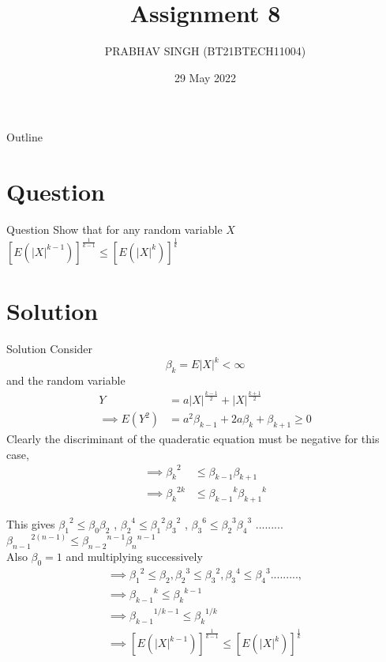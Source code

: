 \documentclass{beamer}
\title{Assignment 8}
\author{PRABHAV SINGH (BT21BTECH11004)}
\date{29 May 2022}
\begin{document}
	
	\begin{frame}
		\titlepage 
	\end{frame}
	
	\logo{}
	
	
	\begin{frame}{Outline}
		\tableofcontents
	\end{frame}
	
	\section{Question}
	\begin{frame}{Question}
	Show that for any random variable $ X $\\
	$ [E(|X|^{k-1})]^{\frac{1}{k-1}} \leq [E(|X|^{k})]^{\frac{1}{k}}$ \\
	\end{frame}
	
	
	\section{Solution}
		\begin{frame}{Solution}
	Consider
	\begin{equation}
		{\beta}_k =E{|X|^{k}} < \infty
	\end{equation}
	and the random variable\\
	\begin{align}
		Y&=a|X|^{\frac{k-1}{2}}+|X|^{\frac{k+1}{2}}\\
		\implies E(Y^{2})&=a^{2}{\beta_{k-1}}+2a{\beta_k}+{\beta_{k+1}} \geq 0
	\end{align}
Clearly the discriminant of the quaderatic equation must be negative for this case,
\begin{align}
	\implies {\beta_k}^{2} &\leq {\beta_{k-1}}{\beta_{k+1}} \\
	\implies  {\beta_k}^{2k} &\leq {{\beta_{k-1}}^{k}}{{\beta_{k+1}}^{k}}  
\end{align}
\end{frame} 

\begin{frame}
	This gives $  {\beta_1}^{2} \leq {{\beta_{0}}}{{\beta_{2}}} $ ,  $  {\beta_2}^{4} \leq {{\beta_{1}}^{2}}{{\beta_{3}}^{2}} $ ,  $  {\beta_3}^{6} \leq {{\beta_{2}}^{3}}{{\beta_{4}}^{3}} $ ......... $  {\beta_{n-1}}^{2(n-1)} \leq {{\beta_{n-2}}^{n-1}}{{\beta_{n}}^{n-1}}  $\\
	
	Also $  {\beta_{0}}=1 $ and multiplying successively \\
	\begin{align}
		\implies   {\beta_1}^{2} \leq{{\beta_{2}}} , {\beta_2}^{3} \leq {{\beta_{3}}^{2}} ,{{\beta_{3}}}^{4} \leq {{\beta_{4}}}^{3} ......... ,\\
		\implies {{\beta_{k-1}}}^{k} \leq {{\beta_{k}}}^{k-1}\\
		\implies {{\beta_{k-1}}}^{1/k-1} \leq {{\beta_{k}}}^{1/k}\\
		\implies \boxed{[E(|X|^{k-1})]^{\frac{1}{k-1}} \leq [E(|X|^{k})]^{\frac{1}{k}}} 
	\end{align}
\end{frame}
\end{document}
